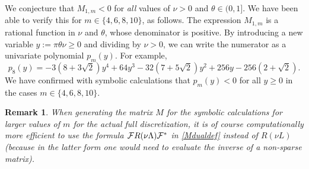 \documentclass[a4paper]{article}
\newtheorem{remark}{Remark}
\newcommand{\cF}{{\cal{F}}}
\begin{document}
\begin{description}[style=unboxed,leftmargin=0cm]
%
%

We conjecture that $M_{1,m}<0$ for \emph{all} values of $\nu>0$ and $\theta\in(0,1]$.
We have been able to verify this for $m\in\{4,6,8,10\}$, as follows.
The expression $M_{1,m}$ is a rational function in $\nu$ and $\theta$, whose
denominator is positive. By introducing a new variable $y:=\pi\theta\nu\ge 0$
and dividing by $\nu>0$, we can write the numerator as a univariate polynomial 
$p_m(y)$.  For example,
$$p_8(y) = -3 \left(8+3 \sqrt{2}\right) y^4+64 y^3-32 \left(7+5 \sqrt{2}\right) y^2+256 y-256 \left(2+\sqrt{2}\right).$$
We have confirmed with symbolic calculations that $p_m(y)<0$
for all $y\ge 0$ in the cases $m\in\{4,6,8,10\}$. 
\begin{remark} 
When generating the matrix $M$ for the symbolic calculations for larger values of $m$ for the actual full discretization, it is of course computationally more efficient to use the formula $\cF R(\nu \Lambda) \cF^*$ in \eqref{Mdualdef} instead of $R(\nu L)$ (because in the latter form one would need to evaluate the inverse of a non-sparse matrix).
\end{remark} 


\end{description}
\end{document}
